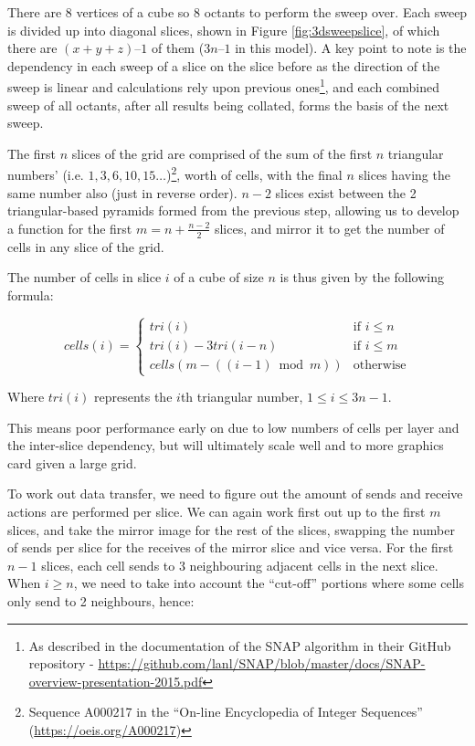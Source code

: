 \documentclass{article}
\begin{document}
There are $ 8 $ vertices of a cube so $ 8 $ octants to perform the sweep over. Each sweep is divided up into diagonal slices, shown in Figure \ref{fig:3dsweepslice}, of which there are $ (x + y + z) – 1 $ of them ($ 3n – 1 $ in this model). A key point to note is the dependency in each sweep of a slice on the slice before as the direction of the sweep is linear and calculations rely upon previous ones\footnote{As described in the documentation of the SNAP algorithm in their GitHub repository - \url{ https://github.com/lanl/SNAP/blob/master/docs/SNAP-overview-presentation-2015.pdf}}, and each combined sweep of all octants, after all results being collated, forms the basis of the next sweep.

The first $ n $ slices of the grid are comprised of the sum of the first $ n $ triangular numbers’ (i.e. $ 1, 3, 6, 10, 15… $)\footnote{Sequence A000217 in the ``On-line Encyclopedia of Integer Sequences'' (\url{https://oeis.org/A000217})}, worth of cells, with the final $ n $ slices having the same number also (just in reverse order). $ n - 2 $ slices exist between the 2 triangular-based pyramids formed from the previous step, allowing us to develop a function for the first $ m = n + \frac{n - 2}{2} $ slices, and mirror it to get the number of cells in any slice of the grid.

The number of cells in slice $ i $ of a cube of size $ n $ is thus given by the following formula:

\begin{equation}
cells(i) = \left\{
	\begin{array}{ll}
		tri(i) & \mbox{if } i \le n \\
		tri(i) - 3tri(i - n) & \mbox{if } i \le m \\
		cells(m - ((i - 1)\bmod m)) & \mbox{otherwise}
	\end{array}
\right.
\end{equation}

Where $ tri(i) $ represents the $i$th triangular number, $ 1 \le i \le 3n - 1 $. 

This means poor performance early on due to low numbers of cells per layer and the inter-slice dependency, but will ultimately scale well and to more graphics card given a large grid.

To work out data transfer, we need to figure out the amount of sends and receive actions are performed per slice. We can again work first out up to the first $ m $ slices, and take the mirror image for the rest of the slices, swapping the number of sends per slice for the receives of the mirror slice and vice versa. For the first $ n - 1 $ slices, each cell sends to 3 neighbouring adjacent cells in the next slice. When $ i \ge n $, we need to take into account the ``cut-off'' portions where some cells only send to 2 neighbours, hence:
\end{document}
